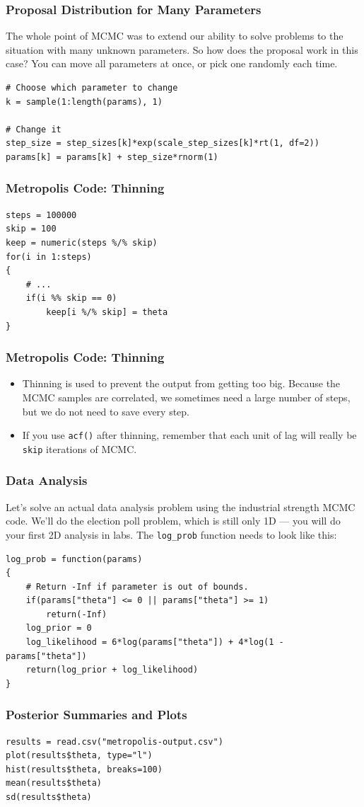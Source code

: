 \documentclass{beamer}
\begin{document}
\begin{frame}[fragile]
\frametitle{Proposal Distribution for Many Parameters}
The whole point of MCMC was to extend our ability to solve problems to the
situation with many unknown parameters. So how does the proposal work in this
case? You can move all parameters at once, or pick one randomly each time.

{\small
\begin{verbatim}
# Choose which parameter to change
k = sample(1:length(params), 1)

# Change it
step_size = step_sizes[k]*exp(scale_step_sizes[k]*rt(1, df=2))
params[k] = params[k] + step_size*rnorm(1)
\end{verbatim}
} %

\end{frame}





\begin{frame}[fragile]
\frametitle{Metropolis Code: Thinning}
\begin{verbatim}
steps = 100000
skip = 100
keep = numeric(steps %/% skip)
for(i in 1:steps)
{
    # ...
    if(i %% skip == 0)
        keep[i %/% skip] = theta
}
\end{verbatim}
\end{frame}


\begin{frame}[fragile]
\frametitle{Metropolis Code: Thinning}
\begin{itemize}
\item Thinning is used to prevent the output from getting too big.
Because the MCMC samples are correlated, we sometimes need a large number
of steps, but we do not need to save every step. \pause
\item If you use \texttt{acf()} after thinning, remember that each unit
of lag will really be \texttt{skip} iterations of MCMC.
\end{itemize}
\end{frame}



\begin{frame}[fragile]
\frametitle{Data Analysis}
Let's solve an actual data analysis problem using the industrial strength
MCMC code. We'll do the election poll problem, which is still only 1D --- you
will do your first 2D analysis in labs. The \texttt{log_prob} function
needs to look like this:
{\footnotesize
\begin{verbatim}
log_prob = function(params)
{
    # Return -Inf if parameter is out of bounds.
    if(params["theta"] <= 0 || params["theta"] >= 1)
        return(-Inf)
    log_prior = 0
    log_likelihood = 6*log(params["theta"]) + 4*log(1 - params["theta"])
    return(log_prior + log_likelihood)
}
\end{verbatim}
} %

\end{frame}


\begin{frame}[fragile]
\frametitle{Posterior Summaries and Plots}

\begin{verbatim}
results = read.csv("metropolis-output.csv")
plot(results$theta, type="l")
hist(results$theta, breaks=100)
mean(results$theta)
sd(results$theta)
\end{verbatim}

\end{frame}
\end{document}
